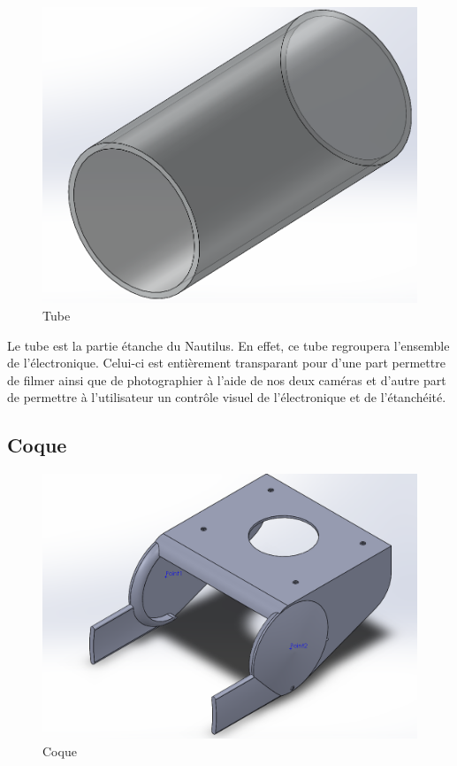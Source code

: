 \documentclass[a4paper,11pt]{report}
\begin{document}
				\begin{figure}[!h]
					\begin{center}
						\includegraphics[scale=0.3]{Photos/Capture6.png}
						\caption{Tube}
					\end{center}
				\end{figure}
				
			Le tube est la partie étanche du Nautilus. En effet, ce tube regroupera l'ensemble de l'électronique. Celui-ci est entièrement transparant pour d'une part permettre de filmer ainsi que de photographier à l'aide de nos deux caméras et d'autre part de permettre à l'utilisateur un contrôle visuel de l'électronique et de l'étanchéité.  
			
				\subsection{Coque}	
				
				\begin{figure}[!h]
					\begin{center}
						\includegraphics[scale=0.3]{Photos/Capture7.png}
						\caption{Coque}
					\end{center}
				\end{figure}
				
\end{document}
